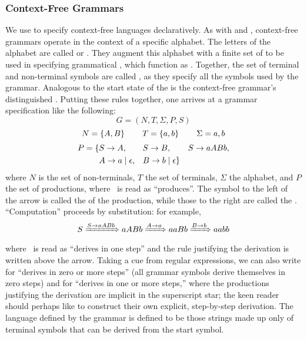 \subsubsection{Context-Free Grammars}
We use  to specify context-free languages declaratively. As with \regexes and \FAs, context-free grammars operate in the context of a specific alphabet. The letters of the alphabet are called  or . They augment this alphabet with a finite set of  to be used in specifying grammatical , which function as . Together, the set of terminal and non-terminal symbols are called , as they specify all the symbols used by the grammar. Analogous to the start state of the \FA is the context-free grammar's distinguished . Putting these rules together, one arrives at a grammar specification like the following:
\[
G = \left(N, T, \Sigma, P, S\right)
\]%
\[
N = \left\{ A, B \right\} \qquad T = \left\{ a, b \right\} \qquad \Sigma = {a, b}
\]
\[\begin{split}
P = \{&S \rightarrow A, &&S \rightarrow B, &&S \rightarrow aABb,\\
&A \rightarrow a \mid \epsilon, &&B \rightarrow b \mid \epsilon\}
\end{split}\]
where $N$ is the set of non-terminals, $T$ the set of terminals, $\Sigma$ the alphabet, and $P$ the set of productions, where \produces\ is read as ``produces''. The symbol to the left of the arrow is called the  of the production, while those to the right are called the . %
``Computation'' proceeds by substitution: for example,
\[
S \derives[S \produces aABb] aABb \derives[A \produces a] aaBb \derives[B \produces b] aabb
\]
where \derives\ is read as ``derives in one step'' and the rule justifying the derivation is written above the arrow. Taking a cue from regular expressions, we can also write \derives[\star] for ``derives in zero or more steps'' (all grammar symbols derive themselves in zero steps) and \derives[+] for ``derives in one or more steps,'' where the productions justifying the derivation are implicit in the superscript star; the keen reader should perhaps like to construct their own explicit, step-by-step derivation. The language defined by the grammar is defined to be those strings made up only of terminal symbols that can be derived from the start symbol.

